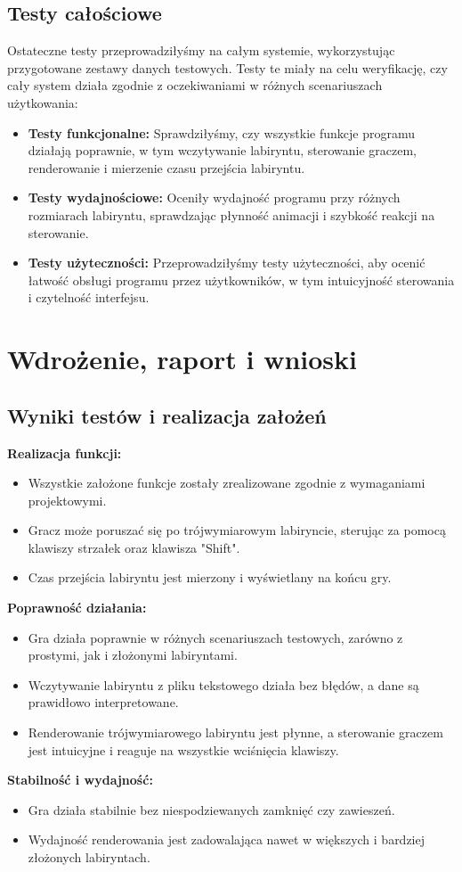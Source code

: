 \documentclass{article}
\begin{document}
\subsection{Testy całościowe}
Ostateczne testy przeprowadziłyśmy na całym systemie, wykorzystując przygotowane zestawy danych testowych. Testy te miały na celu weryfikację, czy cały system działa zgodnie z oczekiwaniami w różnych scenariuszach użytkowania:
\begin{itemize}
    \item \textbf{Testy funkcjonalne:} Sprawdziłyśmy, czy wszystkie funkcje programu działają poprawnie, w tym wczytywanie labiryntu, sterowanie graczem, renderowanie i mierzenie czasu przejścia labiryntu.
    \item \textbf{Testy wydajnościowe:} Oceniły wydajność programu przy różnych rozmiarach labiryntu, sprawdzając płynność animacji i szybkość reakcji na sterowanie.
    \item \textbf{Testy użyteczności:} Przeprowadziłyśmy testy użyteczności, aby ocenić łatwość obsługi programu przez użytkowników, w tym intuicyjność sterowania i czytelność interfejsu.
\end{itemize}

\section{Wdrożenie, raport i wnioski}
\subsection{Wyniki testów i realizacja założeń}
\textbf{Realizacja funkcji:} 
\begin{itemize}
    \item Wszystkie założone funkcje zostały zrealizowane zgodnie z wymaganiami projektowymi.
    \item Gracz może poruszać się po trójwymiarowym labiryncie, sterując za pomocą klawiszy strzałek oraz klawisza "Shift".
    \item Czas przejścia labiryntu jest mierzony i wyświetlany na końcu gry.
\end{itemize}
\textbf{Poprawność działania:}
    \begin{itemize}
        \item Gra działa poprawnie w różnych scenariuszach testowych, zarówno z prostymi, jak i złożonymi labiryntami.
        \item Wczytywanie labiryntu z pliku tekstowego działa bez błędów, a dane są prawidłowo interpretowane.
        \item Renderowanie trójwymiarowego labiryntu jest płynne, a sterowanie graczem jest intuicyjne i reaguje na wszystkie wciśnięcia klawiszy.
    \end{itemize}
\textbf{Stabilność i wydajność:}
\begin{itemize}
    \item Gra działa stabilnie bez niespodziewanych zamknięć czy zawieszeń.
    \item Wydajność renderowania jest zadowalająca nawet w większych i bardziej złożonych labiryntach.
\end{itemize}
\end{document}
